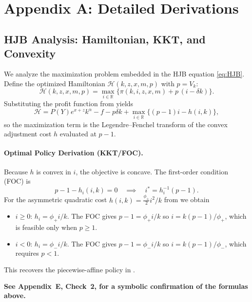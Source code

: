 \documentclass[11pt,letterpaper,oneside]{article}
\newcommand{\R}{\mathbb{R}}
\newcommand{\extbf}[1]{\textbf{#1}}
\begin{document}
\appendix
\section{Appendix A: Detailed Derivations}\label{app:derivations}

\subsection{HJB Analysis: Hamiltonian, KKT, and Convexity}\label{app:hjb_analysis}

We analyze the maximization problem embedded in the HJB equation \eqref{eq:HJB}. Define the optimized Hamiltonian $\mathcal{H}(k,z,x,m,p)$ with $p=V_k$:
\begin{equation}\label{eq:hamiltonian}
\mathcal{H}(k,z,x,m,p) = \max_{i\in\R} \Big\{ \pi(k,i,z,x,m) + p\,(i-\delta k) \Big\}.
\end{equation}
Substituting the profit function from  yields
\[
\mathcal{H} = P(Y)e^{x+z}k^\alpha - f - p\delta k + \max_{i\in\R} \Big\{ (p-1)i - h(i,k) \Big\},
\]
so the maximization term is the Legendre--Fenchel transform of the convex adjustment cost $h$ evaluated at $p-1$.

\paragraph{Optimal Policy Derivation (KKT/FOC).}
Because $h$ is convex in $i$, the objective is concave. The first-order condition (FOC) is
\[
 p-1 - h_i(i,k) = 0 \quad \implies \quad i^* = h_i^{-1}(p-1).
\]
For the asymmetric quadratic cost $h(i,k) = \tfrac{\phi_{\pm}}{2}i^2/k$ from  we obtain
\begin{itemize}[leftmargin=1.25em]
    \item $i \ge 0$: $h_i = \phi_+ i/k$. The FOC gives $p-1 = \phi_+ i/k$ so $i = k(p-1)/\phi_+$, which is feasible only when $p \ge 1$.
    \item $i<0$: $h_i = \phi_- i/k$. The FOC gives $p-1 = \phi_- i/k$ so $i = k(p-1)/\phi_-$, which requires $p<1$.
\end{itemize}
This recovers the piecewise-affine policy in .

\begin{tcolorbox}[sympycheckstyle,title={Verification: FOCs for the optimal policy}]
  \extbf{See Appendix~E, Check~2, for a symbolic confirmation of the formulas above.}
\end{tcolorbox}
\end{document}
